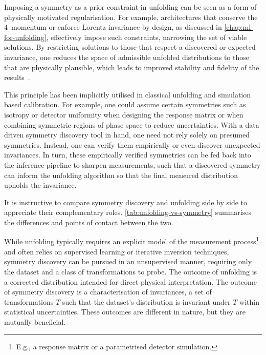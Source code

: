         Imposing a symmetry as a prior constraint in unfolding can be seen as a form of physically motivated regularisation.
        For example, architectures that conserve the 4--momentum or enforce Lorentz invariance by design, as discussed in \cref{chap:ml-for-unfolding}, effectively impose such constraints, narrowing the set of viable solutions.
        By restricting solutions to those that respect a discovered or expected invariance, one reduces the space of admissible unfolded distributions to those that are physically plausible, which leads to improved stability and fidelity of the results~\cite{Brehmer:2024yqw}.
    
        This principle has been implicitly utilised in classical unfolding and simulation based calibration.
        For example, one could assume certain symmetries such as isotropy or detector uniformity when designing the response matrix or when combining symmetric regions of phase space to reduce uncertainties.
        With a data driven symmetry discovery tool in hand, one need not rely solely on presumed symmetries.
        Instead, one can verify them empirically or even discover unexpected invariances.
        In turn, these empirically verified symmetries can be fed back into the inference pipeline to sharpen measurements, such that a discovered symmetry can inform the unfolding algorithm so that the final measured distribution upholds the invariance.
    
        It is instructive to compare symmetry discovery and unfolding side by side to appreciate their complementary roles.
        \cref{tab:unfolding-vs-symmetry} summarises the differences and points of contact between the two.
    
        While unfolding typically requires an explicit model of the measurement process\footnote{E.g., a response matrix or a parametrised detector simulation.} and often relies on supervised learning or iterative inversion techniques, symmetry discovery can be pursued in an unsupervised manner, requiring only the dataset and a class of transformations to probe.
        The outcome of unfolding is a corrected distribution intended for direct physical interpretation.
        The outcome of symmetry discovery is a characterisation of invariances, a set of transformations $T$ such that the dataset’s distribution is invariant under $T$ within statistical uncertainties.
        These outcomes are different in nature, but they are mutually beneficial.
    
